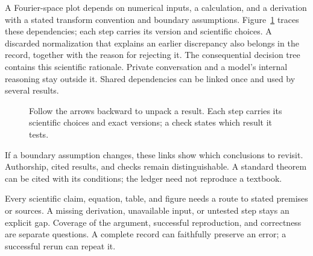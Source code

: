 \documentclass[11pt]{article}
\begin{document}
A Fourier-space plot depends on numerical inputs, a calculation, and a derivation with a stated transform convention and boundary assumptions. Figure~\ref{fig:ledger} traces these dependencies; each step carries its version and scientific choices. A discarded normalization that explains an earlier discrepancy also belongs in the record, together with the reason for rejecting it. The consequential decision tree contains this scientific rationale. Private conversation and a model's internal reasoning stay outside it. Shared dependencies can be linked once and used by several results.

\begin{figure}[ht]
\centering
{}
\caption{Follow the arrows backward to unpack a result. Each step carries its scientific choices and exact versions; a check states which result it tests.}
\label{fig:ledger}
\end{figure}

\begin{samepage}
If a boundary assumption changes, these links show which conclusions to revisit. Authorship, cited results, and checks remain distinguishable. A standard theorem can be cited with its conditions; the ledger need not reproduce a textbook.
\par\end{samepage}

\begin{samepage}
Every scientific claim, equation, table, and figure needs a route to stated premises or sources. A missing derivation, unavailable input, or untested step stays an explicit gap. Coverage of the argument, successful reproduction, and correctness are separate questions. A complete record can faithfully preserve an error; a successful rerun can repeat it.
\par\end{samepage}
\end{document}
